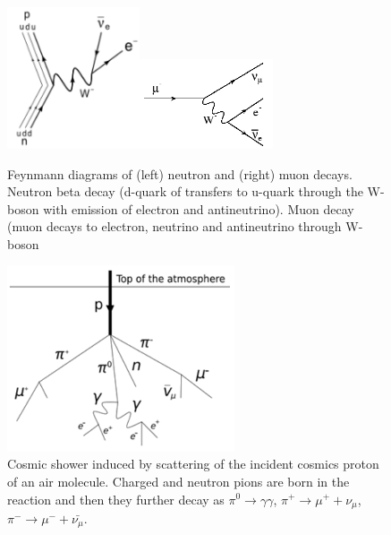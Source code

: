 \begin{figure}
\caption{Feynmann diagrams of (left) neutron and (right) muon decays. Neutron beta decay \cite{ref_fig_NeutronDecay}(d-quark of transfers to u-quark through the W-boson with emission of electron and antineutrino). Muon decay \cite{ref_fig_MuonDecay}(muon decays to electron, neutrino and antineutrino through W-boson}
\label{fig:MuonAndNeutronDecays}
\centering
\includegraphics[width=0.35\textwidth, keepaspectratio=true]{figs/NeutronBetaDecay.png}\includegraphics[width=0.35\textwidth, keepaspectratio=true]{figs/MuonDecay.png}
\end{figure}

\begin{figure}
\caption{Cosmic shower induced by scattering of the incident cosmics proton of an air molecule. Charged and neutron pions are born in the reaction and then they further decay as $\pi^0 \rightarrow \gamma\gamma$, $\pi^+ \rightarrow \mu^+ + \nu_\mu$, $\pi^- \rightarrow \mu^- + \bar{\nu_\mu}$.}
\label{fig:cosmicMuons}
\centering
\includegraphics[width=0.60\textwidth, keepaspectratio=true]{figs/cosmicMuons.png}
\end{figure}



